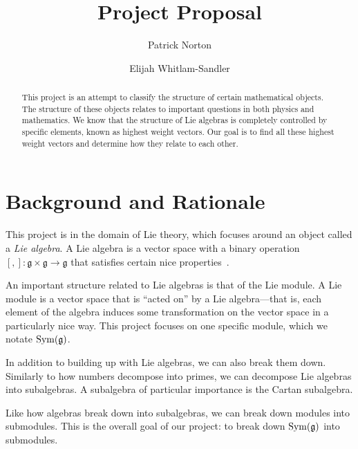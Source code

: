 

\usepackage{biblatex}
\usepackage{microtype}


\title{Project Proposal}
\author{Patrick Norton \and Elijah Whitlam-Sandler}



\maketitle

\begin{abstract}
  This project is an attempt to classify the structure of certain mathematical
  objects. %
  The structure of these objects relates to important questions in both
  physics and mathematics. %
  We know that the structure of Lie algebras is completely controlled by
  specific elements, known as highest weight vectors. Our goal is to find all
  these highest weight vectors and determine how they relate to each other.
\end{abstract}

\section{Background and Rationale}

This project is in the domain of Lie theory, which focuses around an object
called a \emph{Lie algebra}. A Lie algebra is a vector space with a binary
operation $[,]: \mathfrak{g} \times \mathfrak{g} \rightarrow \mathfrak{g}$ that satisfies certain nice properties~\cite{Erd06}.

An important structure related to Lie algebras is that of the Lie module. A Lie
module is a vector space that is ``acted on'' by a Lie algebra---that is, each
element of the algebra induces some transformation on the vector space in a
particularly nice way. This project focuses on one specific module, which we
notate $\operatorname{Sym}(\mathfrak{g})$.

In addition to building up with Lie algebras, we can also break them down.
Similarly to how numbers decompose into primes, we can decompose Lie algebras
into subalgebras. A subalgebra of particular importance is the Cartan
subalgebra.

Like how algebras break down into subalgebras, we can break down modules into
submodules. This is the overall goal of our project: to break down $\operatorname{Sym}(\mathfrak{g})$
into submodules.

